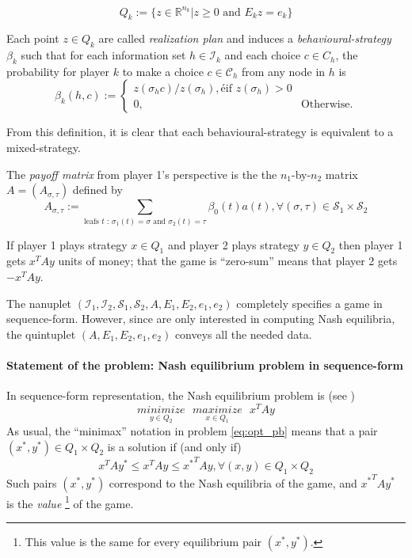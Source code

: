 \documentclass{article} %
\begin{document}
\begin{equation}
  Q_k := \{z \in \mathbb{R}^{n_k}| z \ge 0\text{ and }E_kz = e_k\}
  \label{eq:poly}
\end{equation}

Each point $z \in Q_k$ are called \textit{realization plan} and induces a \textit{behavioural-strategy} $\beta_k$ such that for each information set $h \in \mathcal{I}_k$ and each choice $c \in C_h$, the probability for player $k$ to make a choice $c \in \mathcal{C}_h$ from any node in $h$ is
\begin{equation}
  \beta_k(h, c) := \begin{cases}
    z(\sigma_hc)/z(\sigma_h), é\mbox{if } z(\sigma_h) > 0\\
    0, &\mbox{Otherwise}.
  \end{cases}
\end{equation}

From this definition, it is clear that each behavioural-strategy is equivalent to a mixed-strategy.


The \textit{payoff matrix} from player 1's perspective is the the $n_1$-by-$n_2$ matrix $A = (A_{\sigma,\tau})$ defined by
\begin{equation}
    A_{\sigma,\tau} := \sum_{\text{leafs }t\text{ : } \sigma_1(t) = \sigma\text{ and } \sigma_2(t) = \tau}{\beta_0(t)a(t)}, \forall (\sigma, \tau) \in \mathcal{S}_1 \times \mathcal{S}_2
  \end{equation}

If player 1 plays strategy $x \in Q_1$ and player 2 plays strategy $y \in Q_2$ then player 1 gets $x^TAy$ units of money; that the game is ``zero-sum'' means that player 2 gets $-x^TAy$.

The nanuplet $(\mathcal{I}_1, \mathcal{I}_2, \mathcal{S}_1, \mathcal{S}_2, A, E_1, E_2, e_1, e_2)$ completely specifies a game in sequence-form. However, since are only interested in computing Nash equilibria, the quintuplet $(A, E_1, E_2, e_1, e_2)$ conveys all the needed data.

\paragraph{Statement of the problem: Nash equilibrium problem in sequence-form}
In sequence-form representation, the Nash equilibrium problem is (see \cite{von1996efficient})
\begin{equation}
  \underset{y \in Q_2}{minimize}\text{ }\underset{x \in Q_1}{maximize}\text{ }{x^TAy}
  \label{eq:opt_pb}
\end{equation}
As usual, the ``minimax'' notation in problem \eqref{eq:opt_pb} means that a pair $(x^*, y^*) \in Q_1 \times Q_2$ is a solution if (and only if)
\begin{equation}
  x^TAy^* \le x^TAy \le {x^*}^TAy, \forall (x, y) \in Q_1 \times Q_2
\end{equation}
Such pairs $(x^*, y^*)$ correspond to the Nash equilibria of the game, and ${x^*}^TAy^*$ is the \textit{value}
\footnote{This value is the same for every equilibrium pair $(x^*, y^*)$.} of the game.
  
\end{document}
